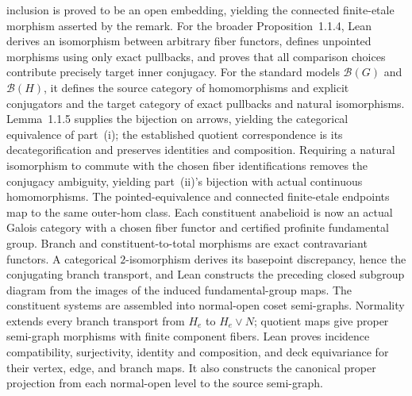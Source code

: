 \begin{definition}
  inclusion is proved to be an open embedding, yielding the connected
  finite-etale morphism asserted by the remark.  For the broader
  Proposition~1.1.4, Lean derives an isomorphism between arbitrary fiber
  functors, defines unpointed morphisms using only exact pullbacks, and proves
  that all comparison choices contribute precisely target inner conjugacy.
  For the standard models $\mathcal B(G)$ and $\mathcal B(H)$, it defines the
  source category of homomorphisms and explicit conjugators and the target
  category of exact pullbacks and natural isomorphisms.  Lemma~1.1.5 supplies
  the bijection on arrows, yielding the categorical equivalence of part~(i);
  the established quotient correspondence is its decategorification and
  preserves identities and composition.  Requiring a natural isomorphism to
  commute with the chosen fiber identifications removes the conjugacy
  ambiguity, yielding part~(ii)'s bijection with actual continuous
  homomorphisms.  The pointed-equivalence and connected finite-etale endpoints
  map to the same outer-hom class.
  Each constituent anabelioid is now an actual Galois category with a chosen
  fiber functor and certified profinite fundamental group.  Branch and
  constituent-to-total morphisms are exact contravariant functors.  A
  categorical $2$-isomorphism derives its basepoint discrepancy, hence the
  conjugating branch transport, and Lean constructs the preceding closed
  subgroup diagram from the images of the induced fundamental-group maps.
  The constituent systems are assembled into normal-open coset semi-graphs.
  Normality extends every branch transport from $H_e$ to $H_e\vee N$; quotient
  maps give proper semi-graph morphisms with finite component fibers.  Lean
  proves incidence compatibility, surjectivity, identity and composition, and
  deck equivariance for their vertex, edge, and branch maps.  It also constructs
  the canonical proper projection from each normal-open level to the source
  semi-graph.
  

\end{definition}
